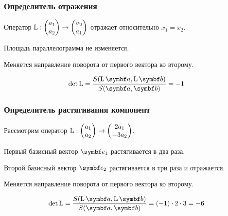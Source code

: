 \begin{frame}
\begin{center}
\begin{tikzpicture}[
scale=1.8,
MyPoints/.style={draw=blue,fill=white,thick},
Segments/.style={draw=blue!50!red!70,thick},
MyCircles/.style={green!50!blue!50,thin}, 
every node/.style={scale=1}
]



\end{tikzpicture}



    \end{center}

\end{frame}


\begin{frame}
\frametitle{Определитель отражения}
    

Оператор $\LL : \begin{pmatrix}
  a_1 \\
  a_2 \\
\end{pmatrix} \to 
\begin{pmatrix}
  a_2 \\
  a_1 \\
\end{pmatrix}$ отражает относительно $x_1= x_2$.


\pause



    Площадь параллелограмма не изменяется. 


    Меняется направление поворота от первого вектора ко второму. 

    \pause

    \[
    \det \LL = \frac{S(\LL \ba, \LL \bb )}{S(\ba, \bb )} = -1
    \]

\end{frame}






\begin{frame}
    \frametitle{Определитель растягивания компонент}


    Рассмотрим оператор $\LL : \begin{pmatrix}
      a_1 \\
      a_2 \\
    \end{pmatrix} \to 
    \begin{pmatrix}
      2a_1 \\
      -3a_2 \\
    \end{pmatrix}$.
    

    \pause

    Первый базисный вектор $\be_1$ растягивается в два раза.
    
    Второй базисный вектор $\be_2$ растягивается в три раза и отражается.


    Меняется направление поворота от первого вектора ко второму. 

    \pause

    \[
    \det \LL = \frac{S(\LL \ba, \LL \bb )}{S(\ba, \bb )} = (-1)\cdot 2\cdot 3 = -6
    \]

\end{frame}




